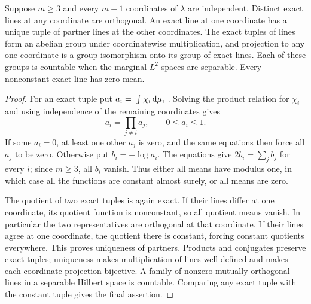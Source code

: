 \begin{lemma}\label{lem:exact-lines}
Suppose $m\ge3$ and every $m-1$ coordinates of $\lambda$ are independent.
Distinct exact lines at any coordinate are orthogonal.  An exact line at
one coordinate has a unique tuple of partner lines at the other coordinates.
The exact tuples of lines form an abelian group under coordinatewise
multiplication, and projection to any one coordinate is a group
isomorphism onto its group of exact lines.  Each of these groups is
countable when the marginal $L^2$ spaces are separable.  Every nonconstant
exact line has zero mean.
\end{lemma}

\begin{proof}
For an exact tuple put $a_i=\lvert \int\chi_i\,\mathrm d\mu_i\rvert$.  Solving the product
relation for $\chi_i$ and using independence of the remaining coordinates
gives
\[
 a_i=\prod_{j\ne i}a_j,\qquad 0\le a_i\le1.
\]
If some $a_i=0$, at least one other $a_j$ is zero, and the same equations
then force all $a_j$ to be zero.  Otherwise put $b_i=-\log a_i$.
The equations give $2b_i=\sum_j b_j$ for every $i$; since $m\ge3$, all
$b_i$ vanish.  Thus either all means have modulus one, in which case all
the functions are constant almost surely, or all means are zero.

The quotient of two exact tuples is again exact.  If their lines differ
at one coordinate, its quotient function is nonconstant, so all quotient
means vanish.  In particular the two representatives are orthogonal at
that coordinate.  If their lines agree at one coordinate, the quotient
there is constant, forcing constant quotients everywhere.  This proves
uniqueness of partners.  Products and conjugates preserve exact tuples;
uniqueness makes multiplication of lines well defined and makes each
coordinate projection bijective.  A family of nonzero mutually orthogonal
lines in a separable Hilbert space is countable.  Comparing any exact tuple
with the constant tuple gives the final assertion.
\end{proof}

